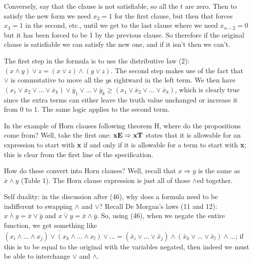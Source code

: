 Conversely, say that the clause is not satisfiable, so all the $t$
are zero.  Then to satisfy the new form we need $x_2 = 1$ for
the first clause, but then that forces $x_3 = 1$ in the second,
etc., until we get to the last clause where we need $x_{n-2} = 0$
but it has been forced to be 1 by the previous clause.  So therefore
if the original clause is satisfiable we can satisfy the new one, and
if it isn't then we can't.

\vskip0.1in \hfil\break

 \hfil\break
The first step in the formula is to use the 
distributive law (2): $\left(x \wedge y\right) \vee z = \left(x \vee z\right) 
\wedge \left(y \vee z\right)$.
The second step makes use of the fact that $\vee$ is commutative to move all the $y$s 
rightward in the left term.  We then have $\left(x_1 \vee \overline{x}_2
\vee \ldots \vee \overline{x}_k\right) \vee \overline{y}_1 \vee \ldots \vee 
\overline{y}_k
\geq \left(x_1 \vee \overline{x}_2 \vee \ldots \vee \overline{x}_k\right)$,
which is clearly true since the extra terms can either leave the truth value 
unchanged or increase it from 0 to 1.  The same logic applies to the second term.

\vskip0.05in \noindent [p58] In the example of Horn clauses following theorem H, where 
do the propositions come from? \hfil\break  
Well, take the first one: $\bf xE \Rightarrow xT$ states
that it is allowable for an expression to start with {\bf x} if and only if
it is allowable for a term to start with {\bf x}; this is clear from the first
line of the specification.  

How do these convert into Horn clauses?  Well, recall that $x \Rightarrow y$
is the same as $\overline{x} \wedge y$ (Table 1).  The Horn clause expression is
just all of those $\wedge$ed together.

\vskip0.1in \hfil\break

\noindent [p63] Self duality: in the discussion after (46), why does a formula
need to be indifferent to swapping $\wedge$ and $\vee$?  Recall De Morgan's
laws (11 and 12): $\bar{x \wedge y} = \bar x \vee \bar y$ and $\bar{x \vee y} =
\bar x \wedge \bar y$.  So, using (46), when we negate the entire function,
we get something like $\bar{\left(x_i \wedge \ldots \wedge x_j\right) \vee
\left(x_k \wedge \ldots \wedge x_l\right) \vee \ldots} =
\left(\bar x_i \vee \ldots \vee \bar x_j\right) \wedge
\left(\bar x_k \vee \ldots \vee \bar x_l\right) \wedge \ldots$;
if this is to be equal to the original with the variables negated, then
indeed we must be able to interchange $\vee$ and $\wedge$.

